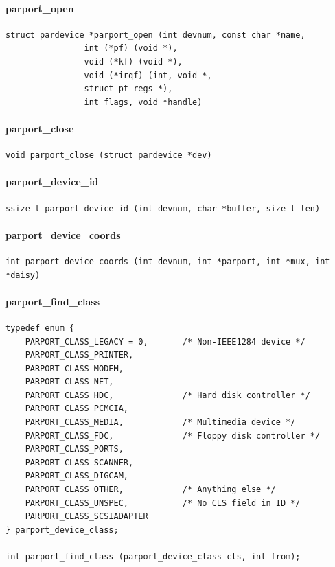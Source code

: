 \documentclass[a4paper,11pt]{article}
\begin{document}
\paragraph{parport\_open}
\begin{verbatim}
struct pardevice *parport_open (int devnum, const char *name,
				int (*pf) (void *),
				void (*kf) (void *),
				void (*irqf) (int, void *,
				struct pt_regs *),
				int flags, void *handle)
\end{verbatim}


\paragraph{parport\_close}
\begin{verbatim}
void parport_close (struct pardevice *dev)
\end{verbatim}


\paragraph{parport\_device\_id}
\begin{verbatim}
ssize_t parport_device_id (int devnum, char *buffer, size_t len)
\end{verbatim}


\paragraph{parport\_device\_coords}
\begin{verbatim}
int parport_device_coords (int devnum, int *parport, int *mux, int *daisy)
\end{verbatim}

\paragraph{parport\_find\_class}
\begin{verbatim}
typedef enum {
    PARPORT_CLASS_LEGACY = 0,       /* Non-IEEE1284 device */
    PARPORT_CLASS_PRINTER,
    PARPORT_CLASS_MODEM,
    PARPORT_CLASS_NET,
    PARPORT_CLASS_HDC,              /* Hard disk controller */
    PARPORT_CLASS_PCMCIA,
    PARPORT_CLASS_MEDIA,            /* Multimedia device */
    PARPORT_CLASS_FDC,              /* Floppy disk controller */
    PARPORT_CLASS_PORTS,
    PARPORT_CLASS_SCANNER,
    PARPORT_CLASS_DIGCAM,
    PARPORT_CLASS_OTHER,            /* Anything else */
    PARPORT_CLASS_UNSPEC,           /* No CLS field in ID */
    PARPORT_CLASS_SCSIADAPTER
} parport_device_class;

int parport_find_class (parport_device_class cls, int from);
\end{verbatim}
\end{document}

